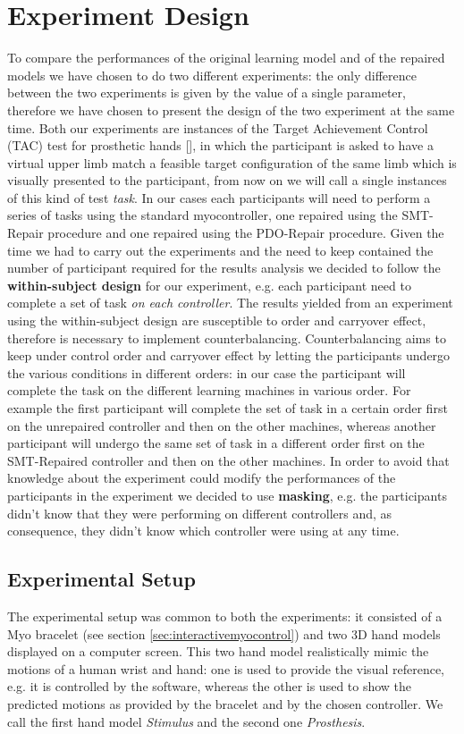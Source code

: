 \section{Experiment Design}\label{sec:exp-design}
To compare the performances of the original learning model and of the repaired models we have chosen to do two different experiments: the only difference between the two experiments is given by the value of a single parameter, therefore we have chosen to present the design of the two experiment at the same time.
Both our experiments are instances of the Target Achievement Control (TAC) test for prosthetic hands [\cite{simon2011target}], in which the participant is asked to have a virtual upper limb match a feasible target configuration of the same limb which is visually presented to the participant, from now on we will call a single instances of this kind of test \textit{task}.
In our cases each participants will need to perform a series of tasks using the standard myocontroller, one repaired using the SMT-Repair procedure and one repaired using the PDO-Repair procedure.
Given the time we had to carry out the experiments and the need to keep contained the number of participant required for the results analysis we decided to follow the \textbf{within-subject design} for our experiment, e.g. each participant need to complete a set of task \textit{on each controller}. The results yielded from an experiment using the within-subject design are susceptible to order and carryover effect, therefore is necessary to implement counterbalancing. Counterbalancing aims to keep under control order and carryover effect by letting the participants undergo the various conditions in different orders: in our case the participant will complete the task on the different learning machines in various order. For example the first participant will complete the set of task in a certain order first on the unrepaired controller and then on the other machines, whereas another participant will undergo the same set of task in a different order first on the SMT-Repaired controller and then on the other machines.
In order to avoid that knowledge about the experiment could modify the performances of the participants in the experiment we decided to use \textbf{masking}, e.g. the participants didn't know that they were performing on different controllers and, as consequence, they didn't know which controller were using at any time.
\subsection{Experimental Setup}\label{subsec:exp-setup}
The experimental setup was common to both the experiments: it consisted of a Myo bracelet (see section \ref{sec:interactivemyocontrol}) and two 3D hand models displayed on a computer screen. This two hand model realistically mimic the motions of a human wrist and hand: one is used to provide the visual reference, e.g. it is controlled by the software, whereas the other is used to show the predicted motions as provided by the bracelet and by the chosen controller. We call the first hand model \textit{Stimulus} and the second one \textit{Prosthesis}.
